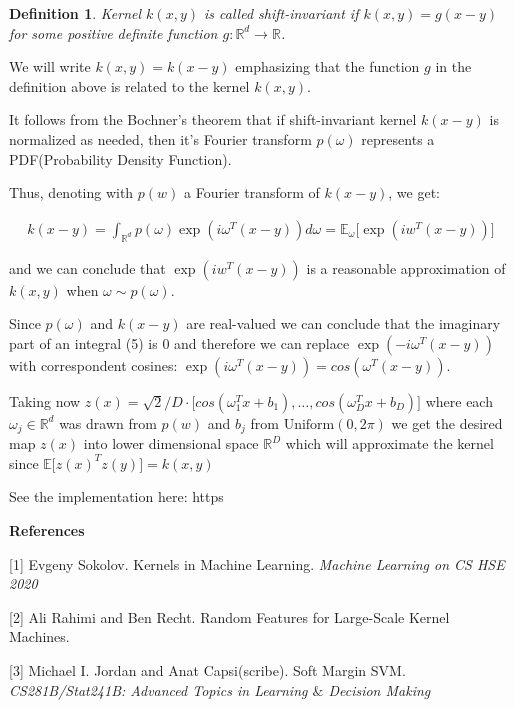 \documentclass{article}
\theoremstyle{bfnote}
\newtheorem{defi}{Definition}
\begin{document}
	\begin{defi}
		Kernel $k(x, y)$ is called \textit{shift-invariant} if $k(x, y)=g(x-y)$ for some positive definite function $g:\mathbb{R}^d \rightarrow \mathbb{R}$. 
	\end{defi}
		We will write $k(x, y)=k(x-y)$ emphasizing that the function $g$ in the definition above is related to the kernel $k(x,y)$.

	It follows from the Bochner's theorem that if shift-invariant kernel $k(x-y)$ is normalized as needed, then it's Fourier transform $p(\omega)$ represents a PDF(Probability Density Function).
	
	Thus, denoting with $p(w)$ a Fourier transform of $k(x-y)$, we get:
	
	\begin{gather}
	k(x-y)=\int_{\mathbb{R}^d} p(\omega) \exp(i\omega^T (x-y)) d\omega
	=\mathbb{E}_\omega \bigg[ \exp(iw^T (x-y)) \bigg] 
	\end{gather}
	
	and we can conclude that $\exp(iw^T (x-y))$ is a reasonable approximation of $k(x, y)$ when $\omega \sim p(\omega)$.
	
	Since $p(\omega)$ and $k(x-y)$ are real-valued we can conclude that the imaginary part of an integral (5) is 0 and therefore we can replace $\exp(-i\omega^T (x-y))$ with correspondent cosines: $\exp(i\omega^T (x-y))=cos(\omega^T (x-y))$.
	
	Taking now $z(x)=\sqrt{2}/D \cdot \big[cos(\omega_1^T x + b_1), \dots, cos(\omega_D^T x + b_D) \big]$ where each $\omega_j \in \mathbb{R}^d$ was drawn from $p(w)$ and $b_j$ from $\text{Uniform}(0, 2\pi)$ we get the desired map $z(x)$ into lower dimensional space $\mathbb{R}^D$ which will approximate the kernel since $\mathbb{E}\big[z(x)^T z(y)\big]=k(x, y)$
	
	\pagebreak
	
	See the implementation here: https
	
	\textbf{References}
	
	[1] Evgeny Sokolov. Kernels in Machine Learning. \textit{Machine Learning on CS HSE 2020}
	
	[2] Ali Rahimi and Ben Recht. Random Features for Large-Scale Kernel Machines.
	
	[3] Michael I. Jordan and Anat Capsi(scribe). Soft Margin SVM. \textit{CS281B/Stat241B: Advanced Topics in Learning $\&$ Decision Making}
		
\end{document}
